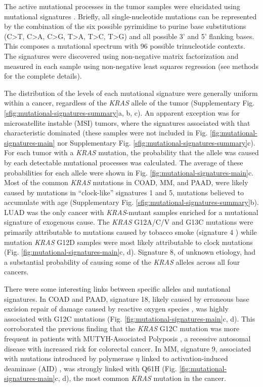 \documentclass[english, 12pt, letterpaper]{article}
\newcommand{\KRAS}{\emph{KRAS}}
\begin{document}
The active mutational processes in the tumor samples were elucidated using mutational signatures \cite{Alexandrov2013}. 
Briefly, all single-nucleotide mutations can be represented by the combination of the six possible pyrimidine to purine base substitutions (C>T, C>A, C>G, T>A, T>C, T>G) and all possible 3’ and 5’ flanking bases. 
This composes a mutational spectrum with 96 possible trinucleotide contexts. 
The signatures were discovered using non-negative matrix factorization and measured in each sample using non-negative least squares regression (see methods for the complete details). 

The distribution of the levels of each mutational signature were generally uniform within a cancer, regardless of the \KRAS{} allele of the tumor (Supplementary Fig. \ref{sfig:mutational-signatures-summary}a, b, c). 
An apparent exception was for microsatellite instable (MSI) tumors, where the signatures associated with that characteristic dominated (these samples were not included in Fig. \ref{fig:mutational-signatures-main} nor Supplementary Fig. \ref{sfig:mutational-signatures-summary}c). 
For each tumor with a \KRAS{} mutation, the probability that the allele was caused by each detectable mutational processes was calculated. 
The average of these probabilities for each allele were shown in Fig. \ref{fig:mutational-signatures-main}c. 
Most of the common \KRAS{} mutations in COAD, MM, and PAAD, were likely caused by mutations in “clock-like” signatures 1 and 5, mutations believed to accumulate with age \cite{Alexandrov2015} (Supplementary Fig. \ref{sfig:mutational-signatures-summary}b). 
LUAD was the only cancer with \KRAS{}-mutant samples enriched for a mutational signature of exogenous cause. 
The \KRAS{} G12A/C/V and G13C mutations were primarily attributable to mutations caused by tobacco smoke (signature 4 \cite{Alexandrov2016}) while mutation \KRAS{} G12D samples were most likely attributable to clock mutations (Fig. \ref{fig:mutational-signatures-main}c, d).
Signature 8, of unknown etiology, had a substantial probability of causing some of the \KRAS{} alleles across all four cancers.

There were some interesting links between specific alleles and mutational signatures.
In COAD and PAAD, signature 18, likely caused by erroneous base excision repair of damage caused by reactive oxygen species \cite{Viel2017, Pilati2017}, was highly associated with G12C mutations (Fig. \ref{fig:mutational-signatures-main}c, d). 
This corroborated the previous finding that the \KRAS{} G12C mutation was more frequent in patients with MUTYH-Associated Polyposis \cite{Viel2017}, a recessive autosomal disease with increased risk for colorectal cancer. 
In MM, signature 9, associated with mutations introduced by polymerase $\eta$ linked to activation-induced deaminase (AID) \cite{Pavri2010Activation-inducedSpt5.}, was strongly linked with Q61H (Fig. \ref{fig:mutational-signatures-main}c, d), the most common \KRAS{} mutation in the cancer.
\end{document}
